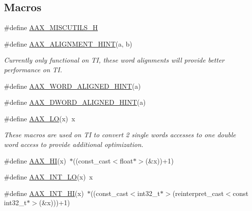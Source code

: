 \subsection*{Macros}
\begin{DoxyCompactItemize}
\item 
\#define \mbox{\hyperlink{a00770_a89034ace563ff82face40a019fc93063}{A\+A\+X\+\_\+\+M\+I\+S\+C\+U\+T\+I\+L\+S\+\_\+H}}
\item 
\#define \mbox{\hyperlink{a00770_a7eb399409be7572c8bd589395c450cdc}{A\+A\+X\+\_\+\+A\+L\+I\+G\+N\+M\+E\+N\+T\+\_\+\+H\+I\+NT}}(a,  b)
\begin{DoxyCompactList}\small\item\em Currently only functional on TI, these word alignments will provide better performance on TI. \end{DoxyCompactList}\item 
\#define \mbox{\hyperlink{a00770_a61b7ad0861da92bf265b94334b9b042f}{A\+A\+X\+\_\+\+W\+O\+R\+D\+\_\+\+A\+L\+I\+G\+N\+E\+D\+\_\+\+H\+I\+NT}}(a)
\item 
\#define \mbox{\hyperlink{a00770_a31858c8aae0329f66ac1bfbc2fadd013}{A\+A\+X\+\_\+\+D\+W\+O\+R\+D\+\_\+\+A\+L\+I\+G\+N\+E\+D\+\_\+\+H\+I\+NT}}(a)
\item 
\#define \mbox{\hyperlink{a00770_a30b9af679d91539e6aa0871d36c4b024}{A\+A\+X\+\_\+\+LO}}(x)~x
\begin{DoxyCompactList}\small\item\em These macros are used on TI to convert 2 single words accesses to one double word access to provide additional optimization. \end{DoxyCompactList}\item 
\#define \mbox{\hyperlink{a00770_a51ea059e820f6ca326531adb132183c3}{A\+A\+X\+\_\+\+HI}}(x)~$\ast$((const\+\_\+cast$<$float$\ast$$>$(\&x))+1)
\item 
\#define \mbox{\hyperlink{a00770_a28c81661236c242d6ed7a3050033bba7}{A\+A\+X\+\_\+\+I\+N\+T\+\_\+\+LO}}(x)~x
\item 
\#define \mbox{\hyperlink{a00770_a6160eaa64818bfff43404b5c057f5f5f}{A\+A\+X\+\_\+\+I\+N\+T\+\_\+\+HI}}(x)~$\ast$((const\+\_\+cast$<$int32\+\_\+t$\ast$$>$(reinterpret\+\_\+cast$<$const int32\+\_\+t$\ast$$>$(\&x)))+1)
\end{DoxyCompactItemize}
